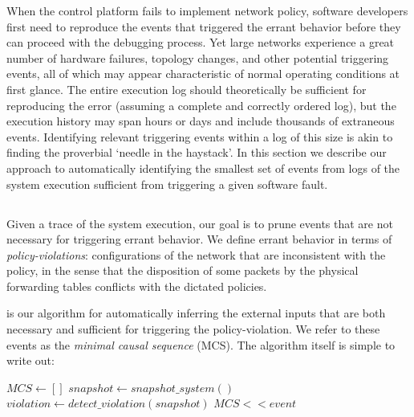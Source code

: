 When the control platform fails to implement network policy, software
developers first need to reproduce the events that triggered the errant
behavior before they can proceed with the debugging process.
Yet large networks experience a great number of hardware failures, topology changes,
and other potential triggering events,
all of which may appear characteristic of normal operating
conditions at first glance. The entire
execution log should theoretically be sufficient for reproducing the error (assuming
a complete and correctly ordered log), but the execution history may span
hours or days and include thousands of extraneous events.
Identifying relevant triggering events within a log of this size is akin to finding
the proverbial `needle in the haystack'.
In this section we describe our approach to automatically identifying
the smallest set of events from logs of the system execution sufficient from
triggering a given software fault.


\subsection{\SIMULATOR{}}
\label{sec:causal_analysis}

Given a trace of the system execution, our goal is to prune events that are not
necessary for triggering
errant behavior. We define errant behavior in terms of {\em policy-violations}:
configurations of the network that are inconsistent
with the policy, in the sense that the disposition of some packets by the
physical forwarding tables conflicts with the dictated policies.

\Simulator{} is our algorithm for automatically inferring the external inputs
that are both necessary and sufficient for triggering the policy-violation. We
refer to these events as the {\em minimal causal sequence} (MCS). The algorithm itself is
simple to write out:

\begin{algorithmic}
\State $MCS \gets []$
    \State $snapshot \gets snapshot\_system()$
    \State $violation \gets detect\_violation(snapshot)$
        \State $MCS << event$
    \EndIf
\EndFor
\end{algorithmic}

